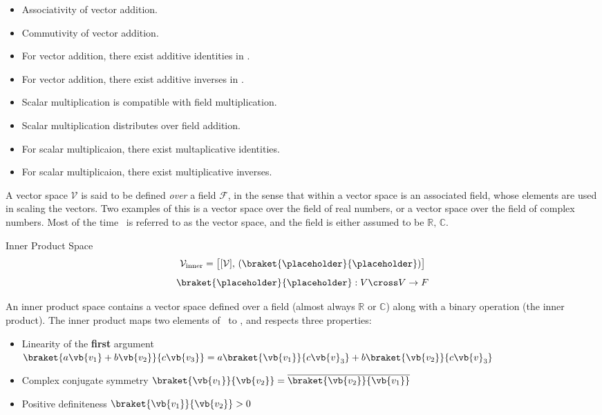 \begin{itemize}
	\item Associativity of vector addition.
	\item Commutivity of vector addition.
	\item For vector addition, there exist additive identities in \Vset.
	\item For vector addition, there exist additive inverses in \Vset.
	\item Scalar multiplication is compatible with field multiplication.
	\item Scalar multiplication distributes over field addition. 
	\item For scalar multiplicaion, there exist multaplicative identities.
	\item For scalar multiplicaion, there exist multiplicative inverses.
\end{itemize}
A vector space \(\mathcal{V}\) is said to be defined \textit{over} a field \(\mathcal{F}\), in the sense that within a vector space is an associated field, whose elements are used in scaling the vectors. Two examples of this is a vector space over the field of real numbers, or a vector space over the field of complex numbers. Most of the time \Vset\ is referred to as the vector space, and the field is either assumed to be \(\mathbb{R},\,\mathbb{C}\).
\newpage
\begin{mathbox}{Inner Product Space}
	\begin{equation*}
		\mathcal{V}_{\rm inner}=\big[[\mathcal{V}],\,(\braket{\placeholder}{\placeholder})\big]
	\end{equation*}
	\begin{equation*}
	\braket{\placeholder}{\placeholder}: V\cross V\rightarrow F
\end{equation*}
\end{mathbox}
An inner product space contains a vector space defined over a field (almost always \(\mathbb{R}\) or \(\mathbb{C}\)) along with a binary operation (the inner product). 
The inner product maps two elements of \Vset\ to \Fset, and respects three properties:
\begin{itemize}
	\item Linearity of the \textbf{first} argument \(\braket{a\vb{v_1}+b\vb{v_2}}{c\vb{v_3}}=a\braket{\vb{v_1}}{c\vb{v}_3}+b\braket{\vb{v_2}}{c\vb{v}_3}\)
	\item Complex conjugate symmetry \(\braket{\vb{v_1}}{\vb{v_2}}=\overline{\braket{\vb{v_2}}{\vb{v_1}}}\)
	\item Positive definiteness \(\braket{\vb{v_1}}{\vb{v_2}}>0\)
\end{itemize}
